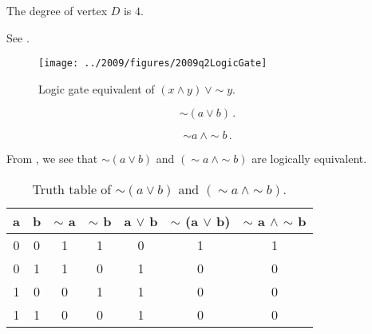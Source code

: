 \begin{subquestions}
\subquestion

The degree of vertex $D$ is $4$.


\subquestion

See .
\begin{figure}
	\begin{center}
		\texttt{[image: ../2009/figures/2009q2LogicGate]}
		\caption{\label{2009:q2:fig:LogicGates} Logic gate equivalent of $(x \land y) ~\lor \sim y$.}
	\end{center}
\end{figure}


\subquestion

\begin{subsubquestions}
	

\subsubquestion

\begin{equation}
	\sim (a \lor b)\,.
\end{equation}


\subsubquestion

\begin{equation}
	\sim a ~\land \sim b\,.
\end{equation}


\subsubquestion

From , we see that $\sim (a \lor b)$ and $(\sim a ~\land \sim b)$ are logically equivalent.
\begin{table}[ht]
	\centering
	\begin{tabular}{|c|c|c|c|c|c|c|}
		\hline
		a & b & $\sim$ a & $\sim$ b & a $\lor$ b & $\sim$ (a $\lor$ b) & $\sim$ a $\land$ $\sim$ b \\
		\hline
		0 & 0 & 1 & 1 & 0 & 1 & 1 \\
		0 & 1 & 1 & 0 & 1 & 0 & 0 \\
		1 & 0 & 0 & 1 & 1 & 0 & 0 \\
		1 & 1 & 0 & 0 & 1 & 0 & 0 \\
		\hline
	\end{tabular}
	\caption{\label{2009:q2:tab:TruthTab2} Truth table of $\sim (a \lor b)$ and $(\sim a ~\land \sim b)$.}
\end{table}


\end{subsubquestions}
\end{subquestions}
